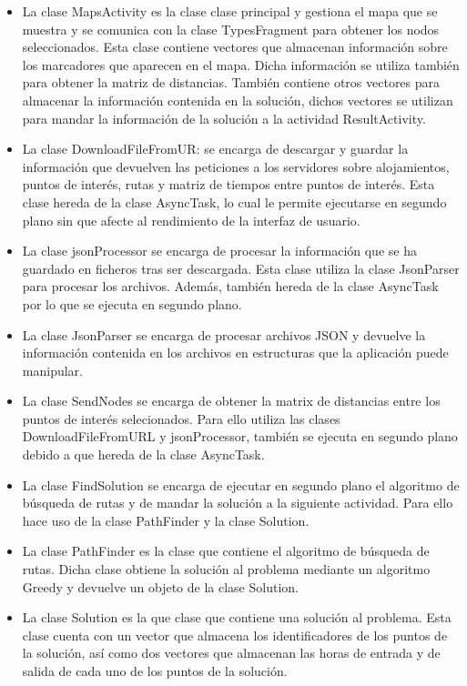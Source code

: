 \begin{itemize}
	\item La clase MapsActivity es la clase clase principal y gestiona el mapa que se muestra y se comunica con la clase TypesFragment para obtener los nodos seleccionados. Esta clase contiene vectores que almacenan información sobre los marcadores que aparecen en el mapa. Dicha información se utiliza también para obtener la matriz de distancias. También contiene otros vectores para almacenar la información contenida en la solución, dichos vectores se utilizan para mandar la información de la solución a la actividad ResultActivity.
	\item La clase DownloadFileFromUR: se encarga de descargar y guardar la información que devuelven las peticiones a los servidores sobre alojamientos, puntos de interés, rutas y matriz de tiempos entre puntos de interés. Esta clase hereda de la clase AsyncTask, lo cual le permite ejecutarse en segundo plano sin que afecte al rendimiento de la interfaz de usuario.
	\item La clase jsonProcessor se encarga de procesar la información que se ha guardado en ficheros tras ser descargada. Esta clase utiliza la clase JsonParser para procesar los archivos. Además, también hereda de la clase AsyncTask por lo que se ejecuta en segundo plano.
	\item La clase JsonParser se encarga de procesar archivos JSON y devuelve la información contenida en los archivos en estructuras que la aplicación puede manipular.
	\item La clase SendNodes se encarga de obtener la matrix de distancias entre los puntos de interés selecionados. Para ello utiliza las clases DownloadFileFromURL y jsonProcessor, también se ejecuta en segundo plano debido a que hereda de la clase AsyncTask.
	\item La clase FindSolution se encarga de ejecutar en segundo plano el algoritmo de búsqueda de rutas y de mandar la solución a la siguiente actividad. Para ello hace uso de la clase PathFinder y la clase Solution.
	\item La clase PathFinder es la clase que contiene el algoritmo de búsqueda de rutas. Dicha clase obtiene la solución al problema mediante un algoritmo Greedy y devuelve un objeto de la clase Solution.
	\item La clase Solution es la que clase que contiene una solución al problema. Esta clase cuenta con un vector que almacena los identificadores de los puntos de la solución, así como dos vectores que almacenan las horas de entrada y de salida de cada uno de los puntos de la solución.
\end{itemize}
